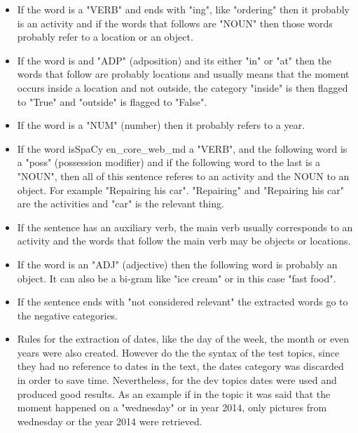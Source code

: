   \begin{itemize}
    
      \item  If the word is a "VERB" and ends with "ing", like "ordering" then it probably is an activity and if the words that follows are "NOUN" then those words probably refer to a location or an object. 
      
      
      \item  If the word is and "ADP" (adposition) and its either "in" or "at" then the words that follow are probably locations and usually means that the moment occurs inside a location and not outside, the category "inside" is then flagged to "True" and "outside" is flagged to "False".
      
      \item If the word is a "NUM" (number) then it probably refers to a year.
      
      \item If the word isSpaCy en\_core\_web\_md a "VERB", and the following word is a "poss" (possession modifier) and if the following word to the last is a "NOUN", then all of this sentence referes to an activity and the NOUN to an object. For example "Repairing his car". "Repairing" and "Repairing his car" are the activities and "car" is the relevant thing.
      
      \item If the sentence has an auxiliary verb, the main verb usually corresponds to an activity and the words that follow the main verb may be objects or locations.
      
      \item If the word is an "ADJ" (adjective) then the following word is probably an object. It can also be a bi-gram like "ice cream" or in this case "fast food".
      
      \item If the sentence ends with "not considered relevant" the extracted words go to the negative categories.
      
      \item Rules for the extraction of dates, like the day of the week, the month or even years were also created. However do the the syntax of the test topics, since they had no reference to dates in the text, the dates category was discarded in order to save time. Nevertheless, for the dev topics dates were used and produced good results. As an example if in the topic it was said that the moment happened on a "wednesday" or in year 2014, only pictures from wednesday or the year 2014 were retrieved.

    \end{itemize}
      
